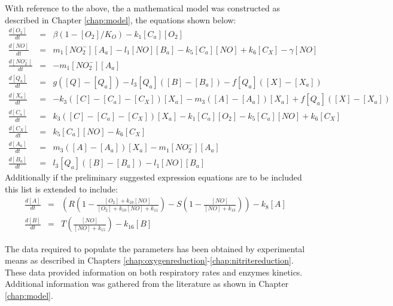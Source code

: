 \noindent With reference to the above, the a mathematical model was constructed as described in Chapter \ref{chap:model}, the equations shown below:
\begin{eqnarray*}
\frac{d[O_2]}{dt} & = & \beta(1-[O_2]/K_O) - k_{1}[C_a][O_2]\\ \nonumber
\frac{d[NO]}{dt} & = & m_{1}[NO_2^-][A_a] - l_1[NO][B_a] - k_5[C_a][NO] + k_6 [C_X] - \gamma[NO]\\ \nonumber
\frac{d[NO_2^-]}{dt} & = & - m_{1}[NO_2^-][A_a]\\ \nonumber
\frac{d[Q_a]}{dt} & = & g([Q] - [Q_a]) - l_3[Q_a]([B] - [B_a]) - f[Q_a]([X]-[X_a])\\ \nonumber
\frac{d[X_a]}{dt} & = & -k_3([C] - [C_a] - [C_X])[X_a]  - m_3([A] - [A_a])[X_a] + f[Q_a]([X]-[X_a])\\ \nonumber
\frac{d[C_a]}{dt} & = & k_3([C] - [C_a] - [C_X])[X_a] - k_{1}[C_a][O_2] - k_5[C_a][NO] + k_6[C_X]\\ \nonumber
\frac{d[C_X]}{dt} & = & k_5[C_a][NO] - k_6 [C_X]\\ \nonumber
\frac{d[A_a]}{dt} & = & m_3([A] - [A_a])[X_a]- m_{1}[NO_2^-][A_a]\\ \nonumber
\frac{d[B_a]}{dt} & = & l_3[Q_a]([B] - [B_a]) - l_1[NO][B_a]
\end{eqnarray*}
Additionally if the preliminary suggested expression equations are to be included this list is extended to include:
\begin{eqnarray*}
\frac{d[A]}{dt} & = & \left(R\left(1 - \frac{[O_2] + k_{10}[NO]}{[O_2] + k_{10}[NO] + k_{11}}\right) - S\left(1 - \frac{[NO]}{[NO] + k_{13}}\right)\right) - k_8[A] \nonumber \\
\frac{d[B]}{dt} & = & T \left(\frac{[NO]}{[NO] + k_{15}}\right) - k_{16}[B]
\end{eqnarray*}

The data required to populate the parameters has been obtained by experimental means as described in Chapters \ref{chap:oxygenreduction}-\ref{chap:nitritereduction}. These data provided information on both respiratory rates and enzymes kinetics. Additional information was gathered from the literature as shown in Chapter \ref{chap:model}.


